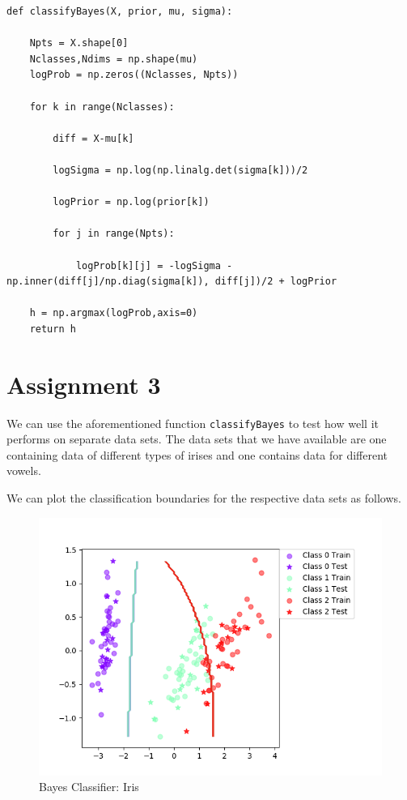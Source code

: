 \documentclass{article}
\begin{document}
\begin{lstlisting}
def classifyBayes(X, prior, mu, sigma):

    Npts = X.shape[0]
    Nclasses,Ndims = np.shape(mu)
    logProb = np.zeros((Nclasses, Npts))
    
    for k in range(Nclasses):
        
        diff = X-mu[k]
        
        logSigma = np.log(np.linalg.det(sigma[k]))/2
        
        logPrior = np.log(prior[k])
        
        for j in range(Npts):
            
            logProb[k][j] = -logSigma - np.inner(diff[j]/np.diag(sigma[k]), diff[j])/2 + logPrior

    h = np.argmax(logProb,axis=0)
    return h
\end{lstlisting}

\section*{Assignment 3}

We can use the aforementioned function \texttt{classifyBayes} to test how well it performs on separate data sets. The data sets that we have available are one containing data of different types of irises and one contains data for different vowels. 

We can plot the classification boundaries for the respective data sets as follows.

\begin{figure}
    \centering
    \includegraphics[scale = 0.90]{BayesIris.png}
    \caption{Bayes Classifier: Iris}
\end{figure}
\end{document}
